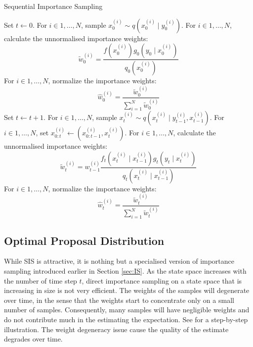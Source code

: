 \begin{algorithm}
\caption{Sequential Importance Sampling}\label{algo:sis}
\begin{algorithmic}[1]
\State Set $t \gets 0$.
\State For $i \in 1, \ldots, N$, sample $x^{(i)}_0 \sim q(x^{(i)}_0 \mid y^{(i)}_0)$.
\State For $i \in 1, \ldots, N$, calculate the unnormalised importance weights:
\begin{equation*}
 \tilde{w}^{(i)}_0 = \dfrac{f(x_0^{(i)})g_0(y_0 \mid x^{(i)}_0)}{q_0(x^{(i)}_0)}
\end{equation*}
\State For $i \in 1, \ldots, N$, normalize the importance weights:
\begin{equation*}
\hat{w}^{(i)}_0 = \dfrac{\tilde{w}^{(i)}_0}{\sum^N_{i=1} \tilde{w}^{(i)}_0}
\end{equation*}
\State Set $t \gets t + 1$.
\State For $i \in 1, \ldots, N$, sample $x^{(i)}_t \sim q(x^{(i)}_t \mid y^{(i)}_{t-1}, x^{(i)}_{t-1})$.
\State For $i \in 1, \ldots, N$, set $x^{(i)}_{0:t} \gets (x^{(i)}_{0:t-1}, x^{(i)}_t)$.
\State For $i \in 1, \ldots, N$, calculate the unnormalised importance weights:
\begin{equation*}
 \tilde{w}^{(i)}_t = w^{(i)}_{t-1} \dfrac{f_t(x^{(i)}_t \mid x^{(i)}_{t-1})g_t(y_t \mid x^{(i)}_t)}{q_t(x^{(i)}_t \mid x^{(i)}_{t-1})}
\end{equation*}
\State For $i \in 1, \ldots, N$, normalize the importance weights:
\begin{equation*}
\hat{w}^{(i)}_t = \dfrac{\tilde{w}^{(i)}_t}{\sum^N_{i=1} \tilde{w}^{(i)}_t}
\end{equation*}
\EndWhile
\EndFunction
\end{algorithmic}
\end{algorithm}

\subsection{Optimal Proposal Distribution}
While SIS is attractive, it is nothing but a specialised version of importance sampling introduced earlier in Section \ref{sec:IS}. As the state space increases with the number of time step $t$, direct importance sampling on a state space that is increasing in size is not very efficient. The weights of the samples will degenerate over time, in the sense that the weights start to concentrate only on a small number of samples. Consequently, many samples will have negligible weights and do not contribute much in the estimating the expectation. See \cite{JAM10} for a step-by-step illustration. The weight degeneracy issue cause the quality of the estimate degrades over time.

